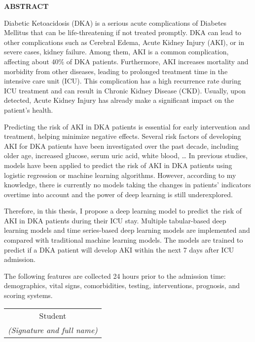 \documentclass[../main.tex]{subfiles}
\begin{document}
\begin{center}
    \Large{\textbf{ABSTRACT}}\\
\end{center}
\vspace{1cm}

\par Diabetic Ketoacidosis (DKA) is a serious acute complications of Diabetes Mellitus that can be life-threatening if not treated promptly.
DKA can lead to other complications such as Cerebral Edema, Acute Kidney Injury (AKI), or in severe cases, kidney failure.
Among them, AKI is a common complication, affecting about 40\% of DKA patients.
Furthermore, AKI increases mortality and morbidity from other diseases, leading to prolonged treatment time in the intensive care unit (ICU).
This complication has a high recurrence rate during ICU treatment and can result in Chronic Kidney Disease (CKD).
Usually, upon detected, Acute Kidney Injury has already make a significant impact on the patient's health.

\par Predicting the risk of AKI in DKA patients is essential for early intervention and treatment, helping minimize negative effects.
Several risk factors of developing AKI for DKA patients have been investigated over the past decade, including older age, increased glucose, serum uric acid, white blood, \dots
In previous studies, models have been applied to predict the risk of AKI in DKA patients using logistic regression or machine learning algorithms.
However, according to my knowledge, there is currently no models taking the changes in patients' indicators overtime into account and the power of deep learning is still underexplored.

\par Therefore, in this thesis, I propose a deep learning model to predict the risk of AKI in DKA patients during their ICU stay.
Multiple tabular-based deep learning models and time series-based deep learning models are implemented and compared with traditional machine learning models.
The models are trained to predict if a DKA patient will develop AKI within the next 7 days after ICU admission.

The following features are collected 24 hours prior to the admission time: demographics, vital signs, comorbidities, testing, interventions, prognosis, and scoring systems.

\begin{flushright}
\begin{tabular}{@{}c@{}}
Student\\
\textit{(Signature and full name)}
\end{tabular}
\end{flushright}
\end{document}

